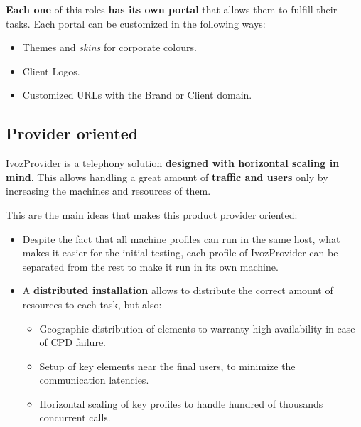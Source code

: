 \documentclass[letterpaper,10pt,spanish]{sphinxmanual}
\begin{document}
\textbf{Each one} of this roles \textbf{has its own portal} that allows them to
fulfill their tasks. Each portal can be customized in the following
ways:
\begin{itemize}
\item {} 
Themes and \emph{skins} for corporate colours.

\item {} 
Client Logos.

\item {} 
Customized URLs with the Brand or Client domain.

\end{itemize}


\subsection{Provider oriented}
\label{basic_concepts/intro/what_is_ivozprovider:operator-oriented}\label{basic_concepts/intro/what_is_ivozprovider:provider-oriented}
IvozProvider is a telephony solution \textbf{designed with horizontal scaling
in mind}. This allows handling a great amount of \textbf{traffic and users}
only by increasing the machines and resources of them.

This are the main ideas that makes this product provider oriented:
\begin{itemize}
\item {} 
Despite the fact that all machine profiles can run in the same host,
what makes it easier for the initial testing, each profile of IvozProvider
can be separated from the rest to make it run in its own machine.

\item {} 
A \textbf{distributed installation} allows to distribute the correct amount of
resources to each task, but also:
\begin{itemize}
\item {} 
Geographic distribution of elements to warranty high availability in
case of CPD failure.

\item {} 
Setup of key elements near the final users, to minimize the communication
latencies.

\item {} 
Horizontal scaling of key profiles to handle hundred of thousands
concurrent calls.

\end{itemize}

\end{itemize}
\end{document}
